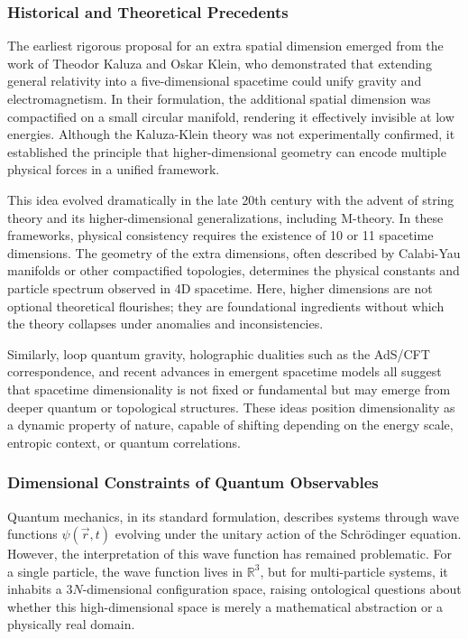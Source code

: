 \documentclass[12pt]{article}
\begin{document}
\subsubsection*{Historical and Theoretical Precedents}

The earliest rigorous proposal for an extra spatial dimension emerged from the work of Theodor Kaluza and Oskar Klein, who demonstrated that extending general relativity into a five-dimensional spacetime could unify gravity and electromagnetism. In their formulation, the additional spatial dimension was compactified on a small circular manifold, rendering it effectively invisible at low energies. Although the Kaluza-Klein theory was not experimentally confirmed, it established the principle that higher-dimensional geometry can encode multiple physical forces in a unified framework.

This idea evolved dramatically in the late 20th century with the advent of string theory and its higher-dimensional generalizations, including M-theory. In these frameworks, physical consistency requires the existence of 10 or 11 spacetime dimensions. The geometry of the extra dimensions, often described by Calabi-Yau manifolds or other compactified topologies, determines the physical constants and particle spectrum observed in 4D spacetime. Here, higher dimensions are not optional theoretical flourishes; they are foundational ingredients without which the theory collapses under anomalies and inconsistencies.

Similarly, loop quantum gravity, holographic dualities such as the AdS/CFT correspondence, and recent advances in emergent spacetime models all suggest that spacetime dimensionality is not fixed or fundamental but may emerge from deeper quantum or topological structures. These ideas position dimensionality as a dynamic property of nature, capable of shifting depending on the energy scale, entropic context, or quantum correlations.

\subsubsection*{Dimensional Constraints of Quantum Observables}

Quantum mechanics, in its standard formulation, describes systems through wave functions $\psi(\vec{r}, t)$ evolving under the unitary action of the Schrödinger equation. However, the interpretation of this wave function has remained problematic. For a single particle, the wave function lives in $\mathbb{R}^3$, but for multi-particle systems, it inhabits a $3N$-dimensional configuration space, raising ontological questions about whether this high-dimensional space is merely a mathematical abstraction or a physically real domain.
\end{document}
